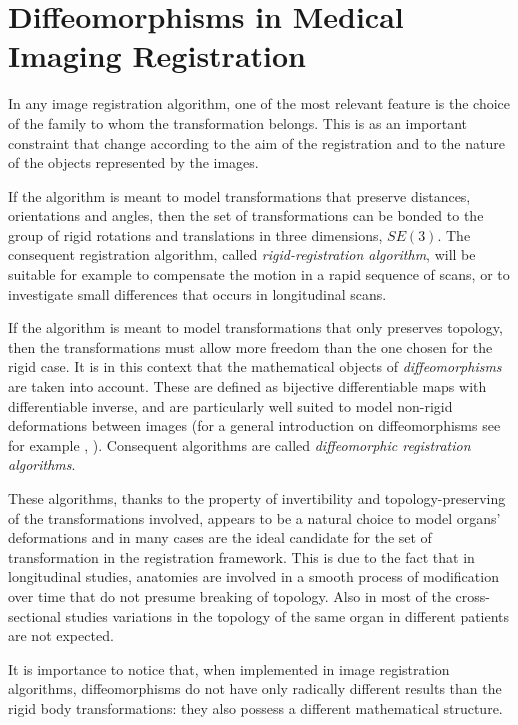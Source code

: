 \section{Diffeomorphisms in Medical Imaging Registration}

In any image registration algorithm, one of the most relevant feature is the choice of the family to whom the transformation belongs. This is as an important constraint that change according to the aim of the registration and to the nature of the objects represented by the images. 

If the algorithm is meant to model transformations that preserve distances, orientations and angles, then the set of transformations can be bonded to the group of rigid rotations and translations in three dimensions, $SE(3)$. The consequent registration algorithm, called \emph{rigid-registration algorithm}, will be suitable for example to compensate the motion in a rapid sequence of scans, or to investigate small differences that occurs in longitudinal scans.

If the algorithm is meant to model transformations that only preserves topology, then the transformations must allow more freedom than the one chosen for the rigid case. It is in this context that the mathematical objects of \emph{diffeomorphisms} are taken into account. These are defined as bijective differentiable maps with differentiable inverse, and are particularly well suited to model non-rigid deformations between images (for a  general introduction on diffeomorphisms see for example \cite{lee2012introduction}, \cite{arnold2006ordinary}). Consequent algorithms are called \emph{diffeomorphic registration algorithms}.

These algorithms, thanks to the property of invertibility and topology-preserving of the transformations involved, appears to be a natural choice to model organs' deformations and in many cases are the ideal candidate for the set of transformation in the registration framework. This is due to the fact that in longitudinal studies, anatomies are involved in a smooth process of modification over time that do not presume breaking of topology. Also in most of the cross-sectional studies variations in the topology of the same organ in different patients are not expected. 

It is importance to notice that, when implemented in image registration algorithms, diffeomorphisms do not have only radically different results than the rigid body transformations: they also possess a different mathematical structure.

